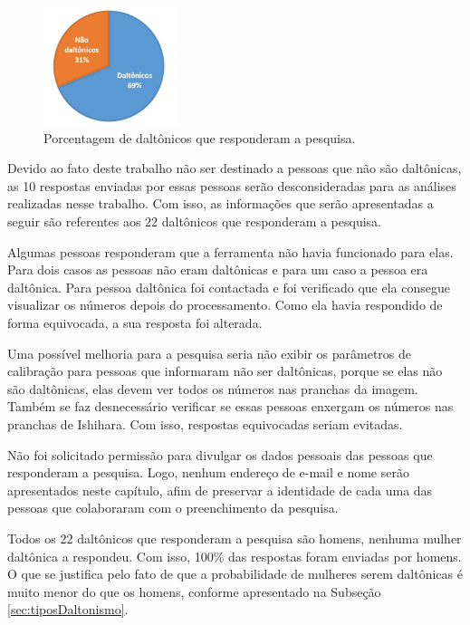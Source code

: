 \documentclass[	12pt, Times, openright, twoside, a4paper, english, brazil]{abntex2}
\begin{document}
\begin{figure}[!htb]
\centering \includegraphics[width=0.35\textwidth]{figuraPorcentagemDaltonicos2.jpg}
\caption{Porcentagem de daltônicos que responderam a pesquisa.} \label{fig:figuraPorcentagemDaltonicos}
\end{figure}

Devido ao fato deste trabalho não ser destinado a pessoas que não são daltônicas, as 10 respostas enviadas por essas pessoas serão desconsideradas para as análises realizadas nesse trabalho. Com isso, as informações que serão apresentadas a seguir são referentes aos 22 daltônicos que responderam a pesquisa.

Algumas pessoas responderam que a ferramenta não havia funcionado para elas. Para dois casos as pessoas não eram daltônicas e para um caso a pessoa era daltônica. Para pessoa daltônica foi contactada e foi verificado que ela consegue visualizar os números depois do processamento. Como ela havia respondido de forma equivocada, a sua resposta foi alterada.

Uma possível melhoria para a pesquisa seria não exibir os parâmetros de calibração para pessoas que informaram não ser daltônicas, porque se elas não são daltônicas, elas devem ver todos os números nas pranchas da imagem. Também se faz desnecessário verificar se essas pessoas enxergam os números nas pranchas de Ishihara. Com isso, respostas equivocadas seriam evitadas.

Não foi solicitado permissão para divulgar os dados pessoais das pessoas que responderam a pesquisa. Logo, nenhum endereço de e-mail e nome serão apresentados neste capítulo, afim de preservar a identidade de cada uma das pessoas que colaboraram com o preenchimento da pesquisa.

Todos os 22 daltônicos que responderam a pesquisa são homens, nenhuma mulher daltônica a respondeu. Com isso, 100\% das respostas foram enviadas por homens. O que se justifica pelo fato de que a probabilidade de mulheres serem daltônicas é muito menor do que os homens, conforme apresentado na Subseção \ref{sec:tiposDaltonismo}.
\end{document}
